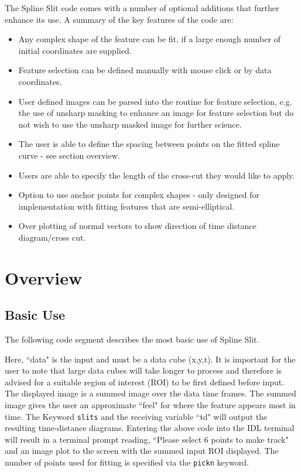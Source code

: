 \documentclass[11pt]{article}
\begin{document}
The Spline Slit code comes with a number of optional additions that further enhance its use. A summary of the key features of the code are:
\begin{itemize}
   \item Any complex shape of the feature can be fit, if a large enough number of initial coordinates are supplied.
  \item Feature selection can be defined manually with mouse click or by data coordinates.
    \item User defined images can be parsed into the routine for feature selection, e.g. the use of unsharp masking to enhance an image for feature selection but do not wish to use the unsharp masked image for further science.
   \item The user is able to define the spacing between points on the fitted spline curve - see section overview.
  \item Users are able to specify the length of the cross-cut they would like to apply.
  \item Option to use anchor points for complex shapes - only designed for implementation with fitting features that are semi-elliptical.
   \item Over plotting of normal vectors to show direction of time distance diagram/cross cut.
\end{itemize}

\section{Overview}
\subsection{Basic Use}

The following code segment describes the most basic use of Spline Slit. 



\noindent Here, ``data" is the input and must be a data cube (x,y,t). It is important for the user to note that large data cubes will take longer to process and therefore is advised for a suitable region of interest (ROI) to be first defined before input. The displayed image is a summed image over the data time frames. The summed image gives the user an approximate ``feel" for where the feature appears most in time. The Keyword \texttt{slits} and the receiving variable ``td" will output the resulting time-distance diagrams. Entering the above code into the IDL terminal will result in a terminal prompt reading, ``Please select 6 points to make track" and an image plot to the screen with the summed input ROI displayed. The number of points used for fitting is specified via the \texttt{pickn} keyword.
\end{document}
